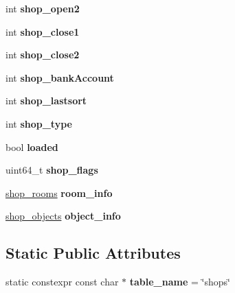 \begin{DoxyCompactItemize}
\mbox{\label{structmods_1_1orm_1_1shop_a4a9028a12a895ae36938b91c87cd9c2f}} 
int {\bfseries shop\+\_\+open2}
\item 
\mbox{\label{structmods_1_1orm_1_1shop_a43fcc611d003a7b1fca630b709a4ef4a}} 
int {\bfseries shop\+\_\+close1}
\item 
\mbox{\label{structmods_1_1orm_1_1shop_ab0e9ca89f3a3e82d665e09ebb447587f}} 
int {\bfseries shop\+\_\+close2}
\item 
\mbox{\label{structmods_1_1orm_1_1shop_a82179733cbb07ba02107fb77cc5e6ef8}} 
int {\bfseries shop\+\_\+bank\+Account}
\item 
\mbox{\label{structmods_1_1orm_1_1shop_a143fd67d6b8ba4f546923b395625bf32}} 
int {\bfseries shop\+\_\+lastsort}
\item 
\mbox{\label{structmods_1_1orm_1_1shop_ab29cb81d86c6b78eff044872c35c2852}} 
int {\bfseries shop\+\_\+type}
\item 
\mbox{\label{structmods_1_1orm_1_1shop_a7f57c4c26d04906bb2efc8fc3523236d}} 
bool {\bfseries loaded}
\item 
\mbox{\label{structmods_1_1orm_1_1shop_ae7e36075cbd2799873676c93b988f085}} 
uint64\+\_\+t {\bfseries shop\+\_\+flags}
\item 
\mbox{\label{structmods_1_1orm_1_1shop_af9bf4888996a8ddfa0929fd7d1674db4}} 
\hyperlink{structmods_1_1orm_1_1shop__rooms}{shop\+\_\+rooms} {\bfseries room\+\_\+info}
\item 
\mbox{\label{structmods_1_1orm_1_1shop_ab53c0f829b7370ff9923d201fa523146}} 
\hyperlink{structmods_1_1orm_1_1shop__objects}{shop\+\_\+objects} {\bfseries object\+\_\+info}
\end{DoxyCompactItemize}
\subsection*{Static Public Attributes}
\begin{DoxyCompactItemize}
\item 
\mbox{\label{structmods_1_1orm_1_1shop_a6552986c4d062d01fe3126a340ec31ba}} 
static constexpr const char $\ast$ {\bfseries table\+\_\+name} = \char`\"{}shops\char`\"{}
\end{DoxyCompactItemize}
